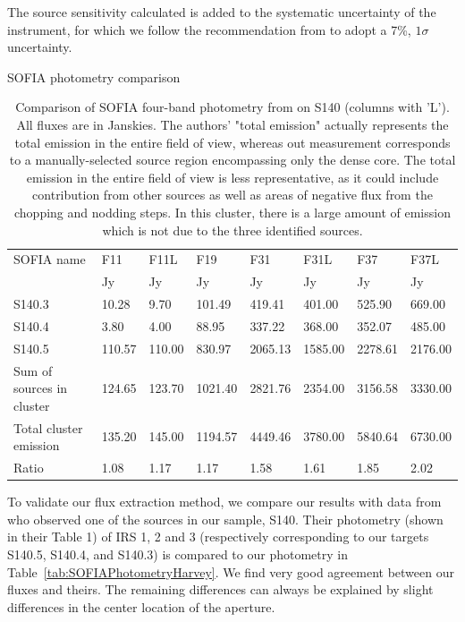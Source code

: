 The source sensitivity calculated is added to the systematic uncertainty of the instrument, for which we follow the recommendation from \citep{Herter:2012hv} to adopt a 7\%, $1\sigma$ uncertainty. 

\renewcommand{\arraystretch}{1.5}
\def\labelitemi{--}
\begin{table}[!h]
\scriptsize
\caption{SOFIA photometry comparison} \label{tab:SOFIAPhotometryHarvey}
\vspace{-0.5cm}
\begin{longtable}{l|P{1cm}P{1cm}P{1cm}P{1cm}P{1cm}P{1cm}P{1cm}}
\toprule															
SOFIA name	&	F11	&	F11L	&	F19	&	F31	&	F31L	&	F37	&	F37L	\\
	&	Jy	&	Jy	&	Jy	&	Jy	&	Jy	&	Jy	&	Jy	\\
\midrule															
S140.3	&	10.28	&	9.70	&	101.49	&	419.41	&	401.00	&	525.90	&	669.00	\\
S140.4	&	3.80	&	4.00	&	88.95	&	337.22	&	368.00	&	352.07	&	485.00	\\
S140.5	&	110.57	&	110.00	&	830.97	&	2065.13	&	1585.00	&	2278.61	&	2176.00	\\
\midrule															
Sum of sources in cluster	&	124.65	&	123.70	&	1021.40	&	2821.76	&	2354.00	&	3156.58	&	3330.00	\\
Total cluster emission	&	135.20	&	145.00	&	1194.57	&	4449.46	&	3780.00	&	5840.64	&	6730.00	\\
Ratio	&	1.08	&	1.17	&	1.17	&	1.58	&	1.61	&	1.85	&	2.02	\\
\bottomrule					
	\end{longtable} 
\caption*{Comparison of SOFIA four-band photometry from \citet{Harvey:2012kw} on S140 (columns with 'L'). All fluxes are in Janskies. The authors' "total emission" actually represents the total emission in the entire field of view, whereas out measurement corresponds to a manually-selected source region encompassing only the dense core. The total emission in the entire field of view is less representative, as it could include contribution from other sources as well as areas of negative flux from the chopping and nodding steps. In this cluster, there is a large amount of emission which is not due to the three identified sources.}

\end{table}


To validate our flux extraction method, we compare our results with data from \citet{Harvey:2012kw} who observed one of the sources in our sample, S140. Their photometry (shown in their Table 1) of IRS 1, 2 and 3 (respectively corresponding to our targets S140.5, S140.4, and S140.3) is compared to our photometry in Table~\ref{tab:SOFIAPhotometryHarvey}. We find very good agreement between our fluxes and theirs. The remaining differences can always be explained by slight differences in the center location of the aperture.


